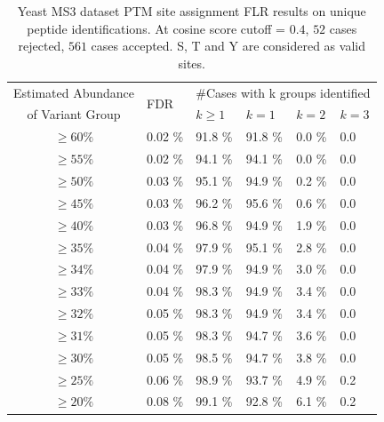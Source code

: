 \begin{table}[h]
  \centering
  \caption{Yeast MS3 dataset PTM site assignment FLR results on unique peptide identifications. At cosine score cutoff = $0.4$, $52$ cases rejected, $561$ cases accepted. S, T and Y are considered as valid sites.}\label{tbl:YeastFLR_uniq_STY}
\begin{tabular}{|c|l|l|l|l|l|}
\hline
Estimated Abundance & \multirow{2}{*}{FDR} & \multicolumn{4}{|c|}{\#Cases with k groups identified }\\
of Variant Group & & $k\ge 1$ & $k=1$ & $k=2$ & $k=3$\\
\hline
$\ge	60	\%$ &	0.02	\% &	91.8	\% &	91.8	\% &	0.0	\% &	0.0	\\
$\ge	55	\%$ &	0.02	\% &	94.1	\% &	94.1	\% &	0.0	\% &	0.0	\\
$\ge	50	\%$ &	0.03	\% &	95.1	\% &	94.9	\% &	0.2	\% &	0.0	\\
$\ge	45	\%$ &	0.03	\% &	96.2	\% &	95.6	\% &	0.6	\% &	0.0	\\
$\ge	40	\%$ &	0.03	\% &	96.8	\% &	94.9	\% &	1.9	\% &	0.0	\\
$\ge	35	\%$ &	0.04	\% &	97.9	\% &	95.1	\% &	2.8	\% &	0.0	\\
$\ge	34	\%$ &	0.04	\% &	97.9	\% &	94.9	\% &	3.0	\% &	0.0	\\
$\ge	33	\%$ &	0.04	\% &	98.3	\% &	94.9	\% &	3.4	\% &	0.0	\\
$\ge	32	\%$ &	0.05	\% &	98.3	\% &	94.9	\% &	3.4	\% &	0.0	\\
$\ge	31	\%$ &	0.05	\% &	98.3	\% &	94.7	\% &	3.6	\% &	0.0	\\
$\ge	30	\%$ &	0.05	\% &	98.5	\% &	94.7	\% &	3.8	\% &	0.0	\\
$\ge	25	\%$ &	0.06	\% &	98.9	\% &	93.7	\% &	4.9	\% &	0.2	\\
$\ge	20	\%$ &	0.08	\% &	99.1	\% &	92.8	\% &	6.1	\% &	0.2	\\
\hline
\end{tabular}
\end{table}

